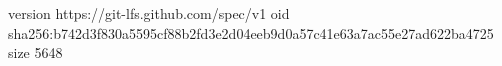 version https://git-lfs.github.com/spec/v1
oid sha256:b742d3f830a5595cf88b2fd3e2d04eeb9d0a57c41e63a7ac55e27ad622ba4725
size 5648
